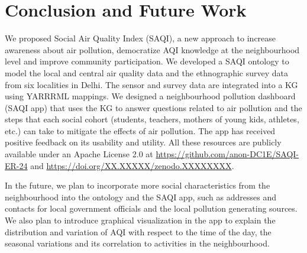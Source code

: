 \section{Conclusion and Future Work}
\label{sec:conclusion}

We proposed Social Air Quality Index (SAQI), a new approach to increase awareness about air pollution,  democratize AQI knowledge at the neighbourhood level and improve community participation. We developed a SAQI ontology to model the local and central air quality data and the ethnographic survey data from six localities in Delhi. The sensor and survey data are integrated into a KG using YARRRML mappings. We designed a neighbourhood pollution dashboard (SAQI app) that uses the KG to answer questions related to air pollution and the steps that each social cohort (students, teachers, mothers of young kids, athletes, etc.) can take to mitigate the effects of air pollution. The app has received positive feedback on its usability and utility. All these resources are publicly available under an Apache License 2.0 at \url{https://github.com/anon-DC1E/SAQI-ER-24} and \url{https://doi.org/XX.XXXXX/zenodo.XXXXXXXX}. 

In the future, we plan to incorporate more social characteristics from the neighbourhood into the ontology and the SAQI app, such as addresses and contacts for local government officials and the local pollution generating sources. We also plan to introduce graphical visualization in the app to explain the distribution and variation of AQI with respect to the time of the day, the seasonal variations and its correlation to activities in the neighbourhood.

